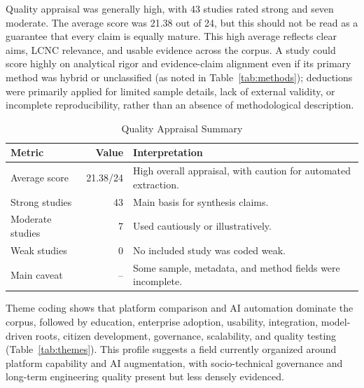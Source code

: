 \documentclass[conference]{IEEEtran}
\begin{document}
Quality appraisal was generally high, with 43 studies rated strong and seven moderate. The average score was 21.38 out of 24, but this should not be read as a guarantee that every claim is equally mature. This high average reflects clear aims, LCNC relevance, and usable evidence across the corpus. A study could score highly on analytical rigor and evidence-claim alignment even if its primary method was hybrid or unclassified (as noted in Table~\ref{tab:methods}); deductions were primarily applied for limited sample details, lack of external validity, or incomplete reproducibility, rather than an absence of methodological description.

\begin{table}[t]
\centering
\caption{Quality Appraisal Summary}
\label{tab:quality}
\scriptsize
\begin{tabularx}{\columnwidth}{l r X}
\toprule
Metric & Value & Interpretation \\
\midrule
Average score & 21.38/24 & High overall appraisal, with caution for automated extraction. \\
Strong studies & 43 & Main basis for synthesis claims. \\
Moderate studies & 7 & Used cautiously or illustratively. \\
Weak studies & 0 & No included study was coded weak. \\
Main caveat & -- & Some sample, metadata, and method fields were incomplete. \\
\bottomrule
\end{tabularx}
\end{table}

Theme coding shows that platform comparison and AI automation dominate the corpus, followed by education, enterprise adoption, usability, integration, model-driven roots, citizen development, governance, scalability, and quality testing (Table~\ref{tab:themes}). This profile suggests a field currently organized around platform capability and AI augmentation, with socio-technical governance and long-term engineering quality present but less densely evidenced.
\end{document}

